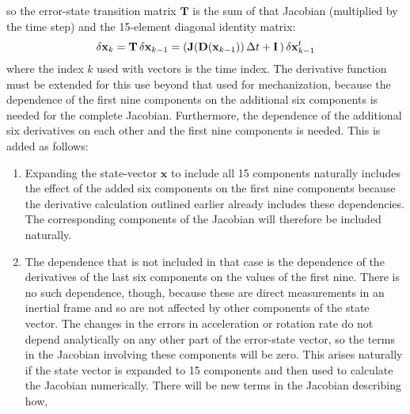 \documentclass[12pt,twoside,english,12pt,twoside,english]{article}\usepackage[]{graphicx}\usepackage[]{color}
\let\OrgIndex\index
\renewcommand*{\index}[1]{\OrgIndex{#1}}
\begin{document}
\begin{enumerate}
so the error-state transition matrix
$\mathbf{T}$ is the sum of that Jacobian (multiplied by the time
step)
and the 15-element diagonal identity
matrix:\\
\begin{equation}
\delta\mathbf{x}_{k}=\mathbf{T}\thinspace\delta\mathbf{x}_{k-1}=\left(\mathbf{J}(\mathbf{D}(\mathbf{x}_{k-1}))\thinspace\Delta t+\mathbf{I}\thinspace\right)\delta\mathbf{x}{}_{k-1}^{t}\label{eq:error-state-transition}
\end{equation}
where the index $k$ used with vectors
is the time index. The derivative
function must be extended for
this use beyond that used for mechanization, because the dependence
of the first nine components on the additional six components is needed
for the complete Jacobian. Furthermore, the dependence of the additional
six derivatives on each other and the first nine components is needed.
This is added as follows:
\begin{enumerate}
\item Expanding the state-vector $\mathbf{x}$ to include all 15 components
naturally includes the effect of the added six components on the first
nine components because the derivative
calculation outlined earlier already includes these dependencies.
The corresponding components of the Jacobian will therefore be included
naturally.
\item The dependence that is not included in that case is the dependence
of the derivatives of the
last six components on the values of the first nine. There is no such
dependence, though, because these are direct measurements in an inertial
frame and so are not affected by
other components of the state vector. The changes in the errors in
acceleration or rotation rate do not depend analytically on any other
part of the error-state vector, so the
terms in the Jacobian involving
these components will be zero. This arises naturally if the state
vector is expanded to 15 components and then used to calculate the
Jacobian
numerically. There will be new terms in the Jacobian describing how,

\end{enumerate}
\end{enumerate}
\end{document}
